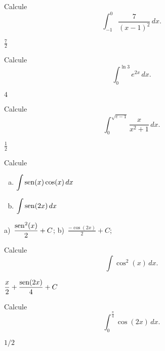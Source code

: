 \begin{exer}
  Calcule
  \begin{equation}
    \int_{-1}^0 \frac{7}{(x-1)^2}\,dx.
  \end{equation}
\end{exer}
\begin{resp}
  $\frac{7}{2}$
\end{resp}

\begin{exer}
  Calcule
  \begin{equation}
    \int_0^{\ln 3} e^{2x}\,dx.
  \end{equation}
\end{exer}
\begin{resp}
  $4$
\end{resp}

\begin{exer}
  Calcule
  \begin{equation}
    \int_0^{\sqrt{e-1}} \frac{x}{x^2+1}\,dx.
  \end{equation}
\end{exer}
\begin{resp}
  $\frac{1}{2}$
\end{resp}

\begin{exer}
  Calcule
  \begin{enumerate}[a)]
  \item $\displaystyle \int \operatorname{sen}(x)\cos(x)\,dx$
  \item $\displaystyle \int \operatorname{sen}(2x)\,dx$
  \end{enumerate}
\end{exer}
\begin{resp}
  a)~$\displaystyle \frac{\operatorname{sen}^2(x)}{2} + C$; b)~$\displaystyle \frac{-\cos(2x)}{2} + C$;
\end{resp}

\begin{exer}
  Calcule
  \begin{equation}
    \int \cos^2(x)\,dx.
  \end{equation}
\end{exer}
\begin{resp}
  $\displaystyle \frac{x}{2} + \frac{\operatorname{sen}(2x)}{4} + C$
\end{resp}

\begin{exer}
  Calcule
  \begin{equation}
    \int_0^{\frac{\pi}{4}}\cos(2x)\,dx.
  \end{equation}
\end{exer}
\begin{resp}
  $1/2$
\end{resp}

